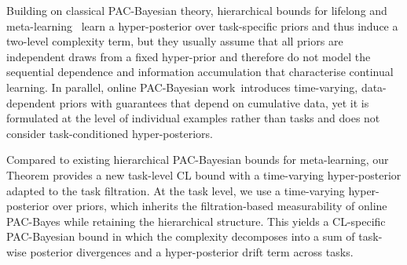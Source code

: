 \documentclass[10pt]{article} %
\begin{document}


Building on classical PAC-Bayesian theory, hierarchical bounds for lifelong and meta-learning~\citep{pentinaPACBayesianBoundLifelong2014,JMLR:v24:22-1254} learn a hyper-posterior over task-specific priors and thus induce a two-level complexity term, but they usually assume that all priors are independent draws from a fixed hyper-prior and therefore do not model the sequential dependence and information accumulation that characterise continual learning. In parallel, online PAC-Bayesian work~\citep{NEURIPS2022_onlineBayes,NEURIPS2024_xinrui}introduces time-varying, data-dependent priors with guarantees that depend on cumulative data, yet it is formulated at the level of individual examples rather than tasks and does not consider task-conditioned hyper-posteriors.


Compared to existing hierarchical PAC-Bayesian bounds for meta-learning, our Theorem provides a new task-level CL bound with a time-varying hyper-posterior adapted to the task filtration.
At the task level, we use a time-varying hyper-posterior over priors, which inherits the filtration-based measurability of online PAC-Bayes while retaining the hierarchical structure. This yields a CL-specific PAC-Bayesian bound in which the complexity decomposes into a sum of task-wise posterior divergences and a hyper-posterior drift term across tasks. 
\end{document}
